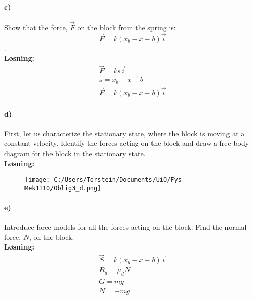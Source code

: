 \documentclass[11pt, A4paper,norsk]{article}
\begin{document}
		\paragraph{c)}
				\begin{flushleft}
Show that the force, $\vec{F}$ on the block from the spring is: $$\vec{F} = k(x_b - x - b)\vec{i}$$. \\
\vspace{1mm}
\textbf{Løsning:} \\
\vspace{1mm}
					\begin{align}
\vec{F} = ks\vec{i} \\
s = x_b - x - b \\
\vec{F} = k(x_b - x - b)\vec{i}
					\end{align}
				\end{flushleft}









		\paragraph{d)}
				\begin{flushleft}
First, let us characterize the stationary state, where the block is moving at a constant velocity. Identify the forces acting on the block and draw a free-body diagram for the block in the stationary state. \\
\vspace{1mm}
\textbf{Løsning:} \\
\vspace{1mm}
				\end{flushleft}
				\begin{figure}[H]
\texttt{[image: C:/Users/Torstein/Documents/UiO/Fys-Mek1110/Oblig3\_d.png]}
				\end{figure}








		\paragraph{e)}
			\begin{flushleft}
Introduce force models for all the forces acting on the block. Find the normal force, $N$, on the block. \\
\vspace{1mm}
\textbf{Løsning:} \\
\vspace{1mm}
				\begin{align}
\vec{S} = k(x_b - x - b)\vec{i} \\
R_d = \mu_d N \\
G = mg \\
N = -mg
				\end{align}
			\end{flushleft}
\end{document}
